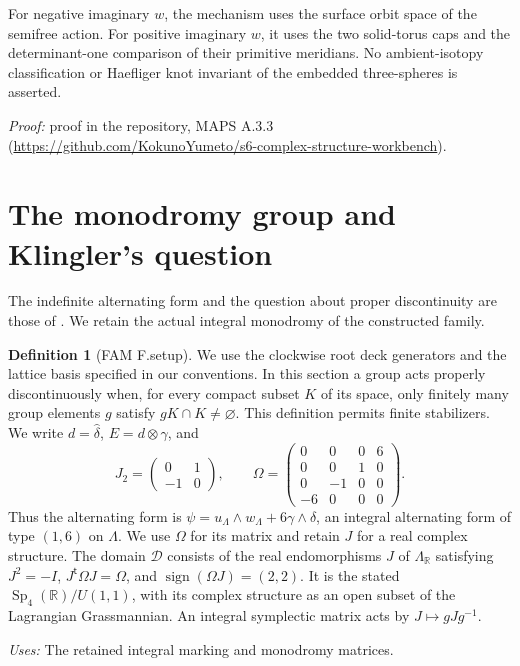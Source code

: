 \documentclass[11pt,a4paper]{article}
\theoremstyle{plain}
\theoremstyle{definition}
\newtheorem{definition}[theorem]{Definition}
\begin{document}
For negative imaginary $w$, the mechanism uses the surface orbit space of the semifree action. For positive imaginary $w$, it uses the two solid-torus caps and the determinant-one comparison of their primitive meridians. No ambient-isotopy classification or Haefliger knot invariant of the embedded three-spheres is asserted.

\noindent\emph{Proof:} proof in the repository, MAPS A.3.3 (\url{https://github.com/KokunoYumeto/s6-complex-structure-workbench}).

\section{The monodromy group and Klingler's question}
\label{sec:monodromy}
The indefinite alternating form and the question about proper discontinuity
are those of \cite[Remark~8.4]{E26}. We retain the actual integral
monodromy of the constructed family.
\begin{definition}[FAM F.setup]\label{fam:F.setup}
We use the clockwise root deck generators and the lattice basis specified
in our conventions.  In this section a group acts properly discontinuously when, for every
compact subset $K$ of its space, only finitely many group elements $g$ satisfy
$gK\cap K\ne\varnothing$.  This definition permits finite stabilizers.  We
write $d=\widehat\delta$, $E=d\otimes\gamma$, and
\[
 J_2=\begin{pmatrix}0&1\\-1&0\end{pmatrix},\qquad
 \Omega=\begin{pmatrix}
 0&0&0&6\\0&0&1&0\\0&-1&0&0\\-6&0&0&0
 \end{pmatrix}.
\]
Thus the alternating form is
$\psi=u_{\Lambda}\wedge w_{\Lambda}+6\gamma\wedge\delta$, an integral alternating form of
type $(1,6)$ on $\Lambda$.  We use $\Omega$ for its matrix and retain $J$ for
a real complex structure.  The domain $\mathcal D$ consists of the real
endomorphisms $J$ of $\Lambda_{\mathbb R}$ satisfying
$J^2=-I$, $J^{\mathsf t}\Omega J=\Omega$, and
$\operatorname{sign}(\Omega J)=(2,2)$.  It is the stated
$\operatorname{Sp}_4(\mathbb R)/U(1,1)$, with its complex structure as an
open subset of the Lagrangian Grassmannian.  An integral symplectic matrix
acts by $J\mapsto gJg^{-1}$.
\end{definition}
\noindent\emph{Uses:} The retained integral marking and monodromy matrices.\par
\end{document}
